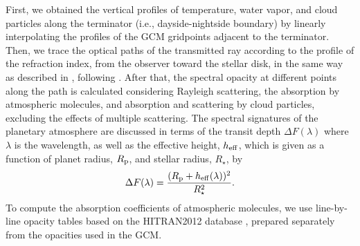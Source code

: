 \documentclass[11pt,numberedappendix,twocolappendix,]{emulateapj}
\begin{document}
First, we obtained the vertical profiles of temperature, water vapor, and cloud particles along the terminator (i.e., dayside-nightside boundary) by linearly interpolating the profiles of the GCM gridpoints adjacent to the terminator. 
Then, we trace the optical paths of the transmitted ray according to the profile of the refraction index, from the observer toward the stellar disk, in the same way as described in \citet{vanderWerf2008}, following \citet{Misra2014}. 
After that, the spectral opacity at different points along the path is calculated considering Rayleigh scattering, the absorption by atmospheric molecules, and absorption and scattering by cloud particles, excluding the effects of multiple scattering. 
The spectral signatures of the planetary atmosphere are discussed in terms of the transit depth $\Delta F(\lambda )$ where $\lambda $ is the wavelength, as well as the effective height, $h_{\rm eff}$, which is given as a function of planet radius, $R_{\rm p}$, and stellar radius, $R_{\star }$, by 
\begin{equation}
\Delta F(\lambda) = \frac{( R_{\rm p} + h_{\rm eff}(\lambda)  )^2}{R_{\star }^2}. 
\end{equation}
To compute the absorption coefficients of atmospheric molecules, we use line-by-line opacity tables based on the HITRAN2012 database \citep{Rothman2013}, prepared separately from the opacities used in the GCM. 
\end{document}
